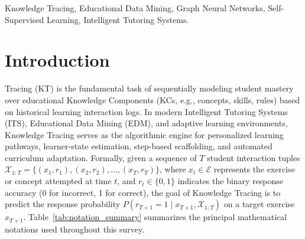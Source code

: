 \documentclass[lettersize,journal]{IEEEtran}
\begin{document}
\begin{IEEEkeywords}
Knowledge Tracing, Educational Data Mining, Graph Neural Networks, Self-Supervised Learning, Intelligent Tutoring Systems.
\end{IEEEkeywords}

\section{Introduction}
\label{sec:intro}

 Tracing (KT) is the fundamental task of sequentially modeling student mastery over educational Knowledge Components (KCs, e.g., concepts, skills, rules) based on historical learning interaction logs. In modern Intelligent Tutoring Systems (ITS), Educational Data Mining (EDM), and adaptive learning environments, Knowledge Tracing serves as the algorithmic engine for personalized learning pathways, learner-state estimation, step-based scaffolding, and automated curriculum adaptation. Formally, given a sequence of $T$ student interaction tuples $\mathcal{X}_{1:T} = \{(x_1, r_1), (x_2, r_2), \dots, (x_T, r_T)\}$, where $x_t \in \mathcal{E}$ represents the exercise or concept attempted at time $t$, and $r_t \in \{0, 1\}$ indicates the binary response accuracy (0 for incorrect, 1 for correct), the goal of Knowledge Tracing is to predict the response probability $P(r_{T+1} = 1 \mid x_{T+1}, \mathcal{X}_{1:T})$ on a target exercise $x_{T+1}$. Table~\ref{tab:notation_summary} summarizes the principal mathematical notations used throughout this survey.
\end{document}
